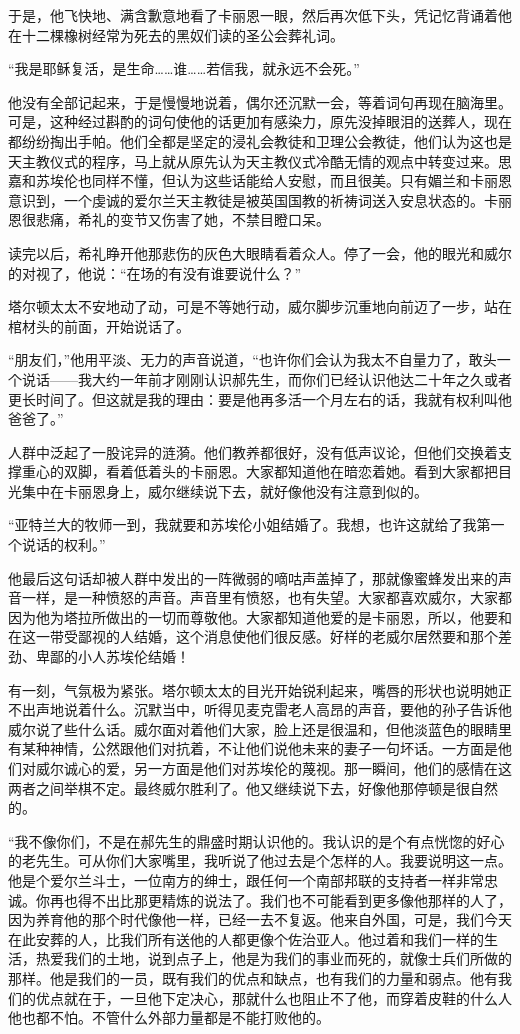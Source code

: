 \par 于是，他飞快地、满含歉意地看了卡丽恩一眼，然后再次低下头，凭记忆背诵着他在十二棵橡树经常为死去的黑奴们读的圣公会葬礼词。
\par “我是耶稣复活，是生命……谁……若信我，就永远不会死。”
\par 他没有全部记起来，于是慢慢地说着，偶尔还沉默一会，等着词句再现在脑海里。可是，这种经过斟酌的词句使他的话更加有感染力，原先没掉眼泪的送葬人，现在都纷纷掏出手帕。他们全都是坚定的浸礼会教徒和卫理公会教徒，他们认为这也是天主教仪式的程序，马上就从原先认为天主教仪式冷酷无情的观点中转变过来。思嘉和苏埃伦也同样不懂，但认为这些话能给人安慰，而且很美。只有媚兰和卡丽恩意识到，一个虔诚的爱尔兰天主教徒是被英国国教的祈祷词送入安息状态的。卡丽恩很悲痛，希礼的变节又伤害了她，不禁目瞪口呆。
\par 读完以后，希礼睁开他那悲伤的灰色大眼睛看着众人。停了一会，他的眼光和威尔的对视了，他说：“在场的有没有谁要说什么？”
\par 塔尔顿太太不安地动了动，可是不等她行动，威尔脚步沉重地向前迈了一步，站在棺材头的前面，开始说话了。
\par “朋友们，”他用平淡、无力的声音说道，“也许你们会认为我太不自量力了，敢头一个说话——我大约一年前才刚刚认识郝先生，而你们已经认识他达二十年之久或者更长时间了。但这就是我的理由：要是他再多活一个月左右的话，我就有权利叫他爸爸了。”
\par 人群中泛起了一股诧异的涟漪。他们教养都很好，没有低声议论，但他们交换着支撑重心的双脚，看着低着头的卡丽恩。大家都知道他在暗恋着她。看到大家都把目光集中在卡丽恩身上，威尔继续说下去，就好像他没有注意到似的。
\par “亚特兰大的牧师一到，我就要和苏埃伦小姐结婚了。我想，也许这就给了我第一个说话的权利。”
\par 他最后这句话却被人群中发出的一阵微弱的嘀咕声盖掉了，那就像蜜蜂发出来的声音一样，是一种愤怒的声音。声音里有愤怒，也有失望。大家都喜欢威尔，大家都因为他为塔拉所做出的一切而尊敬他。大家都知道他爱的是卡丽恩，所以，他要和在这一带受鄙视的人结婚，这个消息使他们很反感。好样的老威尔居然要和那个差劲、卑鄙的小人苏埃伦结婚！
\par 有一刻，气氛极为紧张。塔尔顿太太的目光开始锐利起来，嘴唇的形状也说明她正不出声地说着什么。沉默当中，听得见麦克雷老人高昂的声音，要他的孙子告诉他威尔说了些什么话。威尔面对着他们大家，脸上还是很温和，但他淡蓝色的眼睛里有某种神情，公然跟他们对抗着，不让他们说他未来的妻子一句坏话。一方面是他们对威尔诚心的爱，另一方面是他们对苏埃伦的蔑视。那一瞬间，他们的感情在这两者之间举棋不定。最终威尔胜利了。他又继续说下去，好像他那停顿是很自然的。
\par “我不像你们，不是在郝先生的鼎盛时期认识他的。我认识的是个有点恍惚的好心的老先生。可从你们大家嘴里，我听说了他过去是个怎样的人。我要说明这一点。他是个爱尔兰斗士，一位南方的绅士，跟任何一个南部邦联的支持者一样非常忠诚。你再也得不出比那更精炼的说法了。我们也不可能看到更多像他那样的人了，因为养育他的那个时代像他一样，已经一去不复返。他来自外国，可是，我们今天在此安葬的人，比我们所有送他的人都更像个佐治亚人。他过着和我们一样的生活，热爱我们的土地，说到点子上，他是为我们的事业而死的，就像士兵们所做的那样。他是我们的一员，既有我们的优点和缺点，也有我们的力量和弱点。他有我们的优点就在于，一旦他下定决心，那就什么也阻止不了他，而穿着皮鞋的什么人他也都不怕。不管什么外部力量都是不能打败他的。

